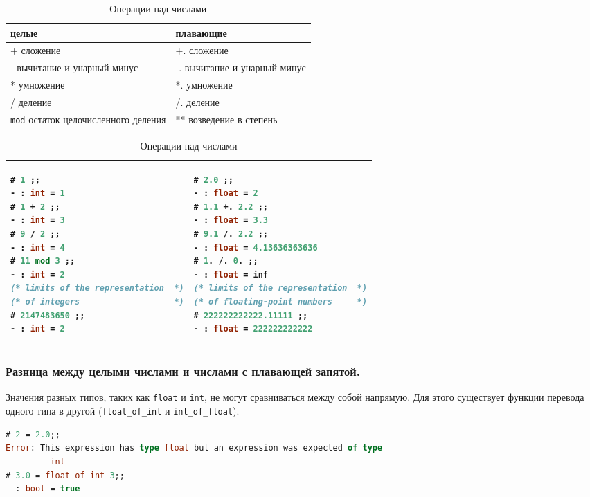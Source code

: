 \begin{table}[hl]
\begin{center}
	\label{tbl:operations_on_numbers}
	\caption{Операции над числами}
	\begin{tabular}{|p{7.2cm}|p{7.2cm}|}
	\hline
	целые & плавающие \\
	\hline
	+ сложение & +. сложение \\
	\hline
	- вычитание и унарный минус & -. вычитание и унарный минус \\
	\hline
	* умножение & *. умножение \\
	\hline
	/ деление & /. деление \\
	\hline
	\texttt{mod} остаток целочисленного деления & ** возведение в степень \\
	\hline
	\end{tabular}
	\begin{tabular}{|p{7.2cm}|p{7.2cm}|}
	\hline
{\begin{lstlisting}[language=OCaml,frame=none]
# 1 ;;
- : int = 1
# 1 + 2 ;;
- : int = 3
# 9 / 2 ;;
- : int = 4
# 11 mod 3 ;;
- : int = 2
(* limits of the representation  *)
(* of integers                   *)
# 2147483650 ;;
- : int = 2
\end{lstlisting}}
 &
{\begin{lstlisting}[language=OCaml,frame=none]
# 2.0 ;;
- : float = 2
# 1.1 +. 2.2 ;;
- : float = 3.3
# 9.1 /. 2.2 ;;
- : float = 4.13636363636
# 1. /. 0. ;;
- : float = inf
(* limits of the representation  *)
(* of floating-point numbers     *)
# 222222222222.11111 ;;
- : float = 222222222222
\end{lstlisting}}
\\
	\hline
	\end{tabular}
\end{center}
\end{table}

\subsubsection{Разница между целыми числами и числами с плавающей запятой.}

Значения разных типов, таких как \texttt{float} и \texttt{int}, не могут
сравниваться между собой напрямую. Для этого существует функции перевода одного
типа в другой (\texttt{float\_of\_int} и \texttt{int\_of\_float}).

\begin{lstlisting}[language=OCaml]
# 2 = 2.0;;
Error: This expression has type float but an expression was expected of type
         int
# 3.0 = float_of_int 3;;
- : bool = true
\end{lstlisting}

